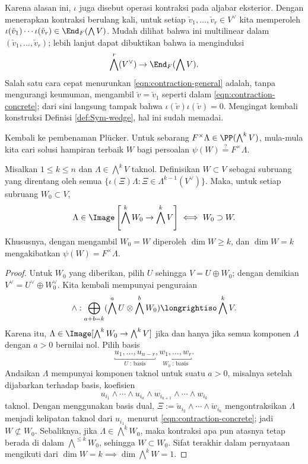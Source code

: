 Karena alasan ini, $\iota$ juga disebut operasi kontraksi pada aljabar eksterior. Dengan menerapkan kontraksi berulang kali, untuk setiap $\check{v}_1, \ldots, \check{v}_r \in V^\vee$ kita memperoleh $\iota(\check{v}_1) \cdots \iota(\check{v}_r) \in \End_F(\bigwedge V)$. Mudah dilihat bahwa ini multilinear dalam $(\check{v}_1, \ldots, \check{v}_r)$; lebih lanjut dapat dibuktikan bahwa ia menginduksi
\begin{equation}\label{eqn:contraction-general}
	\bigwedge^r(V^\vee) \to \End_F(\bigwedge V).
\end{equation}	
Salah satu cara cepat menurunkan \eqref{eqn:contraction-general} adalah, tanpa mengurangi keumuman, mengambil $\check{v} = \check{v}_1$ seperti dalam \eqref{eqn:contraction-concrete}; dari sini langsung tampak bahwa $\iota(\check{v}) \iota(\check{v})=0$. Mengingat kembali konstruksi Definisi \ref{def:Sym-wedge}, hal ini sudah memadai.

Kembali ke pembenaman Plücker. Untuk sebarang $F^\times \Lambda \in \PP(\bigwedge^k V)$, mula-mula kita cari solusi hampiran terbaik $W$ bagi persoalan $\psi(W) \stackrel{?}{=} F^\times \Lambda$.
\begin{lemma}\label{prop:Plucker-W}
	Misalkan $1 \leq k \leq n$ dan $\Lambda \in \bigwedge^k V$ taknol. Definisikan $W \subset V$ sebagai subruang yang direntang oleh semua $\{ \iota(\Xi) \Lambda : \Xi \in \Lambda^{k-1}(V^\vee) \}$. Maka, untuk setiap subruang $W_0 \subset V$,
	\[ \Lambda \in \Image\left[ \bigwedge^k W_0 \to \bigwedge^k V \right] \iff W_0 \supset W. \]
	Khususnya, dengan mengambil $W_0=W$ diperoleh $\dim W \geq k$, dan $\dim W = k$ mengakibatkan $\psi(W) = F^\times\Lambda$.
\end{lemma}
\begin{proof}
	Untuk $W_0$ yang diberikan, pilih $U$ sehingga $V = U \oplus W_0$; dengan demikian $V^\vee =U^\vee \oplus W_0^\vee$. Kita kembali mempunyai penguraian
	\[ \wedge: \bigoplus_{a+b=k} (\bigwedge^a U \otimes \bigwedge^b W_0) \longrightiso \bigwedge^k V.\]
	Karena itu, $\Lambda \in \Image[\bigwedge^k W_0 \to \bigwedge^k V]$ jika dan hanya jika semua komponen $\Lambda$ dengan $a > 0$ bernilai nol. Pilih basis
	\[ \underbracket{u_1, \ldots, u_{n-r}}_{U\; \text{: basis}}, \underbracket{w_1, \ldots, w_r}_{W_0\; \text{: basis}}. \]
	Andaikan $\Lambda$ mempunyai komponen taknol untuk suatu $a > 0$, misalnya setelah dijabarkan terhadap basis, koefisien
	\[ u_{i_1} \wedge \cdots \wedge u_{i_a} \wedge w_{i_{a+1}} \wedge \cdots \wedge w_{i_k} \]
	taknol. Dengan menggunakan basis dual, $\Xi := \check{u}_{i_2} \wedge \cdots \wedge \check{w}_{i_k}$ mengontraksikan $\Lambda$ menjadi kelipatan taknol dari $u_{i_1}$ menurut \eqref{eqn:contraction-concrete}; jadi $W \not\subset W_0$. Sebaliknya, jika $\Lambda \in \bigwedge^k W_0$, maka kontraksi apa pun atasnya tetap berada di dalam $\bigwedge^{\leq k} W_0$, sehingga $W \subset W_0$. Sifat terakhir dalam pernyataan mengikuti dari $\dim W = k \implies \dim \bigwedge^k W = 1$.
\end{proof}

